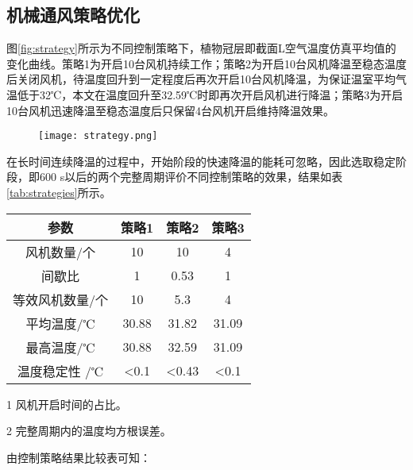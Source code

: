 	\subsection{机械通风策略优化}
图\ref{fig:strategy}所示为不同控制策略下，植物冠层即截面L空气温度仿真平均值的变化曲线。策略1为开启10台风机持续工作；策略2为开启10台风机降温至稳态温度后关闭风机，待温度回升到一定程度后再次开启10台风机降温，为保证温室平均气温低于32℃，本文在温度回升至32.59℃时即再次开启风机进行降温；策略3为开启10台风机迅速降温至稳态温度后只保留4台风机开启维持降温效果。

	\begin{figure}[!htbp]
		\centering
		\texttt{[image: strategy.png]}
	\end{figure}
	在长时间连续降温的过程中，开始阶段的快速降温的能耗可忽略，因此选取稳定阶段，即600 s以后的两个完整周期评价不同控制策略的效果，结果如表\ref{tab:strategies}所示。
	
		\begin{table}[!htbp]
  			\centering
  			\begin{threeparttable}[b]
  			\begin{tabular}{cccc} \toprule
			参数 & 策略1 & 策略2 & 策略3\\ \midrule
			风机数量/个 & 10 & 10 & 4\\
			间歇比\tnote{1} & 1 & 0.53 & 1\\
			等效风机数量/个 & 10 & 5.3 & 4\\
			平均温度/℃ & 30.88 & 31.82 & 31.09\\
			最高温度/℃ & 30.88 & 32.59 & 31.09\\
			温度稳定性\tnote{2} \hspace{1mm} /℃ & <0.1 & <0.43 & <0.1\\ \bottomrule
 			\end{tabular}
 			\begin{tablenotes}
    			\item [1] 风机开启时间的占比。
    			\item [2] 完整周期内的温度均方根误差。
   			 \end{tablenotes}
  		\end{threeparttable}
		\end{table}
	由控制策略结果比较表可知：
	
